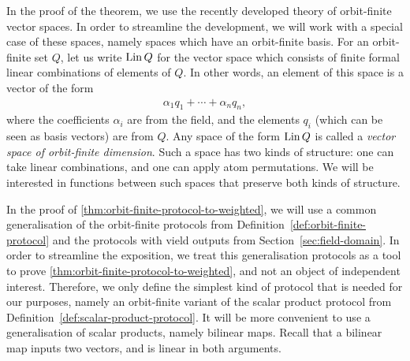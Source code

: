 In the proof of the theorem, we use the recently developed theory of orbit-finite vector spaces. In order to streamline the development, we will work with a special case of these spaces, namely spaces which have an orbit-finite basis.
For an orbit-finite set $Q$, let us write $\operatorname{Lin} Q$ for the vector space which consists of finite formal linear combinations of elements of $Q$. In other words, an element of this space is a vector of the form 
\begin{align*}
\alpha_1 q_1 + \cdots + \alpha_n q_n,
\end{align*}
where the coefficients $\alpha_i$ are from the field, and the elements $q_i$ (which can be seen as basis vectors) are from $Q$. Any space of the form $\operatorname{Lin} Q$ is called a \emph{vector space of orbit-finite dimension}. Such a space has two kinds of structure: one can take linear combinations, and one can apply atom permutations. We will  be interested in functions between such spaces that preserve both kinds of structure.

In the proof of \cref{thm:orbit-finite-protocol-to-weighted}, we will use a common generalisation of the  orbit-finite protocols from Definition~\ref{def:orbit-finite-protocol} and the protocols with vield outputs from  Section~\ref{sec:field-domain}.  In order to streamline the exposition, we treat this generalisation protocols as a tool to prove \cref{thm:orbit-finite-protocol-to-weighted}, and not an object of independent interest. Therefore, we only define the simplest kind of protocol that is needed for our purposes, namely an orbit-finite variant of the scalar product protocol from Definition~\ref{def:scalar-product-protocol}. It will be more convenient to use a generalisation of scalar products, namely bilinear maps. Recall that a bilinear map inputs two vectors, and is linear in both arguments. 




